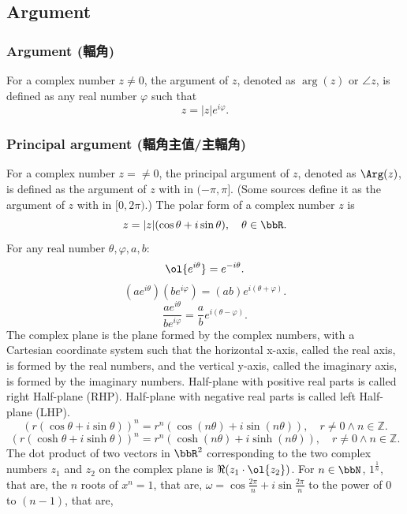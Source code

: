 \documentclass[a4paper,12pt]{article}
\begin{document}
\subsection{Argument}
\subsubsection{Argument (輻角)}
For a complex number $z\neq 0$, the argument of $z$, denoted as $\arg(z)$ or $\angle z$, is defined as any real number $\varphi $ such that
\[z=|z|e^{i\varphi}.\]
\subsubsection{Principal argument (輻角主值/主輻角)}
For a complex number $z=\neq 0$, the principal argument of $z$, denoted as $\Arg(z)$, is defined as the argument of $z$ with in $(-\pi,\pi]$. (Some sources define it as the argument of $z$ with in $[0,2\pi)$.)
The polar form of a complex number $z$ is
\[z=|z|(\cos\theta+i\sin\theta),\quad\theta\in\bbR.\]
For any real number $\theta,\varphi,a,b$:
\[\ol{e^{i\theta}}=e^{-i\theta}.\]
\[(ae^{i\theta})(be^{i\varphi})=(ab)e^{i(\theta+\varphi)}.\]
\[\frac{ae^{i\theta}}{be^{i\varphi}}=\frac{a}{b}e^{i(\theta-\varphi)}.\]
The complex plane is the plane formed by the complex numbers, with a Cartesian coordinate system such that the horizontal x-axis, called the real axis, is formed by the real numbers, and the vertical y-axis, called the imaginary axis, is formed by the imaginary numbers. Half-plane with positive real parts is called right Half-plane (RHP). Half-plane with negative real parts is called left Half-plane (LHP).
\[(r(\cos\theta+i\sin\theta))^n=r^n(\cos(n\theta)+i\sin(n\theta)),\quad r\neq 0\land n\in\mathbb{Z}.\]
\[(r(\cosh\theta+i\sinh\theta))^n=r^n(\cosh(n\theta)+i\sinh(n\theta)),\quad r\neq 0\land n\in\mathbb{Z}.\]
The dot product of two vectors in $\bbR^2$ corresponding to the two complex numbers $z_1$ and $z_2$ on the complex plane is $\Re(z_1\cdot\ol{z_2})$.
For $n\in\bbN$, $1^{\frac{1}{n}}$, that are, the $n$ roots of $x^n=1$, that are, $\omega=\cos\frac{2\pi}{n}+i\sin\frac{2\pi}{n}$ to the power of $0$ to $(n-1)$, that are,
\end{document}
